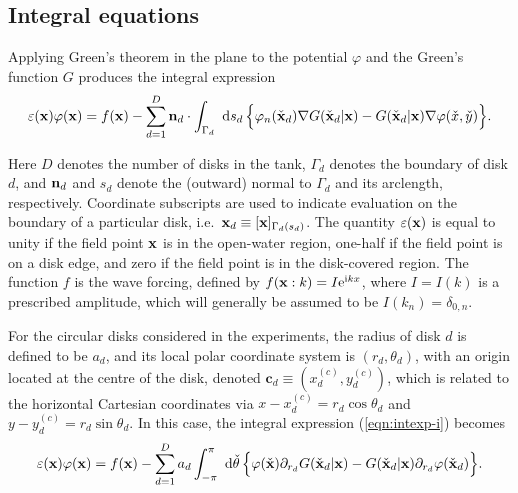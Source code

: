 \documentclass[12pt,a4paper]{article}
\newcommand{\wrt}{ ~ {\rm d}}
\newcommand{\bnab}{{\bf \nabla}}
\def\ci{{\mathrm i}}
\renewcommand{\exp}{{\rm e}}
\newcommand{\eps}{\varepsilon}
\newcommand{\ds}{\displaystyle}
\newcommand{\ie}{i.e.\ }
\newcommand{\vph}{{\varphi}}
\newcommand{\nm}{{\bf n}}
\newcommand{\bdy}{\Gamma}
\newcommand{\rad}{a}
\newcommand{\xo}{\check{x}}
\newcommand{\yo}{\check{y}}
\newcommand{\bx}{{\bf x}}
\newcommand{\bxo}{\check{\textbf{x}}}
\newcommand{\tho}{\check{\theta}}
\newcommand{\force}{f}
\newcommand{\cent}{\textbf{c}}
\begin{document}

\subsection{Integral equations}

Applying Green's theorem in the plane to the potential $\vph$ and the Green's function $G$ produces the integral expression
\begin{equation}\label{eqn:intexp-i}
\eps(\bx)\vph(\bx)
=
\ds
\force(\bx)
-
\sum_{d=1}^{D}
\nm_{d}\cdot
\int_{\bdy_{d}}\wrt s_{d} \,
\Big\{
\vph_{n}(\bxo_{d})
\bnab
G(\bxo_{d}\vert \bx)
-
G(\bxo_{d}\vert \bx)
\bnab
\vph(\xo,\yo)
\Big\}
.
\end{equation}

Here $D$ denotes the number of disks in the tank, $\bdy_{d}$ denotes the  boundary of disk $d$, and $\nm_{d}$ and $s_{d}$ denote the (outward) normal to $\bdy_{d}$ and its arclength, respectively.
Coordinate subscripts are used to  indicate evaluation on the boundary of a particular disk, \ie $\bx_{d}\equiv[\bx ]_{\bdy_{d}(s_{d})}$.
The quantity $\eps(\bx)$ is equal to unity if the field point $\bx$ is in the open-water region, one-half if the field point is on a disk edge, and zero if the field point is in the disk-covered region.
The function $\force$ is the wave forcing, defined by 
$\force(\bx:k)=I\exp^{\ci kx}$, where $I=I(k)$ is a prescribed amplitude, which will generally be assumed to be $I(k_{n})=\delta_{0,n}$.

For the circular disks considered in the experiments,  the radius of disk $d$ is defined to be $\rad_{d}$, and its local polar coordinate system is $(r_{d},\theta_{d})$, with an origin located at the centre of the disk, denoted %
$\cent_{d}\equiv (x_{d}^{(c)},y_{d}^{(c)})$, which is related to the horizontal Cartesian coordinates via $x-x_{d}^{(c)}=r_{d}\cos\theta_{d}$ and $y-y_{d}^{(c)}=r_{d}\sin\theta_{d}$.
In this case, the integral expression (\ref{eqn:intexp-i}) becomes
\begin{equation}\label{eqn:intexp_ii}
\eps(\bx)\vph(\bx)
=
\force(\bx)
-
\sum_{d=1}^{D}
\rad_{d}
\int_{-\pi}^{\pi}\wrt \tho \,
\Big\{
\vph(\bxo)
\partial_{r_{d}}
G(\bxo_{d}\vert \bx)
-
G(\bxo_{d}\vert \bx)
\partial_{r_{d}}
\vph(\bxo_{d})
\Big\}
.
\end{equation}
\end{document}
